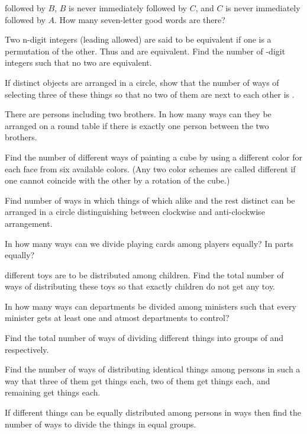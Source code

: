   followed by $B$, $B$ is never immediately followed by $C$, and $C$ is never immediately followed by
  $A$. How many seven-letter good words are there?
\item Two n-digit integers (leading  allowed) are said to be equivalent if one is a permutation of the
  other. Thus  and  are equivalent. Find the number of -digit integers such that no
  two are equivalent.
\item If  distinct objects are arranged in a circle, show that the number of ways of selecting three of
  these things so that no two of them are next to each other is .
\item There are  persons including two brothers. In how many ways can they be arranged on a round
  table if there is exactly one person between the two brothers.
\item Find the number of different ways of painting a cube by using a different color for each face from
  six available colors. (Any two color schemes are called different if one cannot coincide with the other
  by a rotation of the cube.)
\item Find number of ways in which  things of which  alike and the rest distinct can be arranged
  in a circle distinguishing between clockwise and anti-clockwise arrangement.
\item In how many ways can we divide  playing cards among  players equally? In  parts
  equally?
\item {} different toys are to be distributed among  children. Find the total number of ways of
  distributing these toys so that exactly  children do not get any toy.
\item In how many ways can  departments be divided among  ministers such that every minister gets
  at least one and atmost  departments to control?
\item Find the total number of ways of dividing  different things into groups of  and 
  respectively.
\item Find the number of ways of distributing  identical things among  persons in such a way
  that three of them get  things each, two of them get  things each, and remaining  get 
  things each.
\item If  different things can be equally distributed among  persons in  ways then find the
  number of ways to divide the  things in  equal groups.
